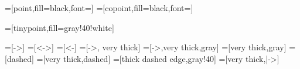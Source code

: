 =[point,fill=black,font=\color{white}]
=[copoint,fill=black,font=\color{white}]

=[tinypoint,fill=gray!40!white]

=[->]
=[<->]
=[<-]
=[->, very thick]
=[->,very thick,gray]
=[very thick,gray]
=[dashed]
=[very thick,dashed]
=[thick dashed edge,gray!40]
=[very thick,|->]